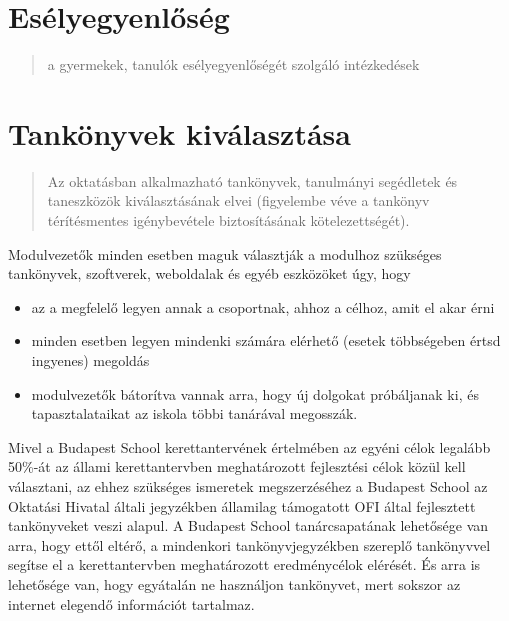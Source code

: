 \section{Esélyegyenlőség}\label{esuxe9lyegyenlux151suxe9g}

\begin{quote}
      a gyermekek, tanulók esélyegyenlőségét szolgáló intézkedések
\end{quote}






\section{Tankönyvek kiválasztása}

\begin{quote}
      Az oktatásban alkalmazható tankönyvek, tanulmányi segédletek és
      taneszközök kiválasztásának elvei (figyelembe véve a tankönyv
      térítésmentes igénybevétele biztosításának kötelezettségét).
\end{quote}

Modulvezetők minden esetben maguk választják a modulhoz szükséges
tankönyvek, szoftverek, weboldalak és egyéb eszközöket úgy, hogy

\begin{itemize}

      \item
            az a megfelelő legyen annak a csoportnak, ahhoz a célhoz, amit el
            akar
            érni
      \item
            minden esetben legyen mindenki számára elérhető (esetek többségeben
            értsd ingyenes) megoldás
      \item
            modulvezetők bátorítva vannak arra, hogy új dolgokat próbáljanak
            ki,
            és tapasztalataikat az iskola többi tanárával megosszák.
\end{itemize}

Mivel a Budapest School kerettantervének értelmében az egyéni célok
legalább 50\%-át az állami kerettantervben meghatározott fejlesztési
célok közül kell választani, az ehhez szükséges ismeretek megszerzéséhez
a Budapest School az Oktatási Hivatal általi jegyzékben államilag
támogatott OFI által fejlesztett tankönyveket veszi alapul. A Budapest
School tanárcsapatának lehetősége van arra, hogy ettől eltérő, a
mindenkori tankönyvjegyzékben szereplő tankönyvvel segítse el a
kerettantervben meghatározott eredménycélok elérését. És arra is
lehetősége van, hogy egyátalán ne használjon tankönyvet, mert sokszor az
internet elegendő információt tartalmaz.

